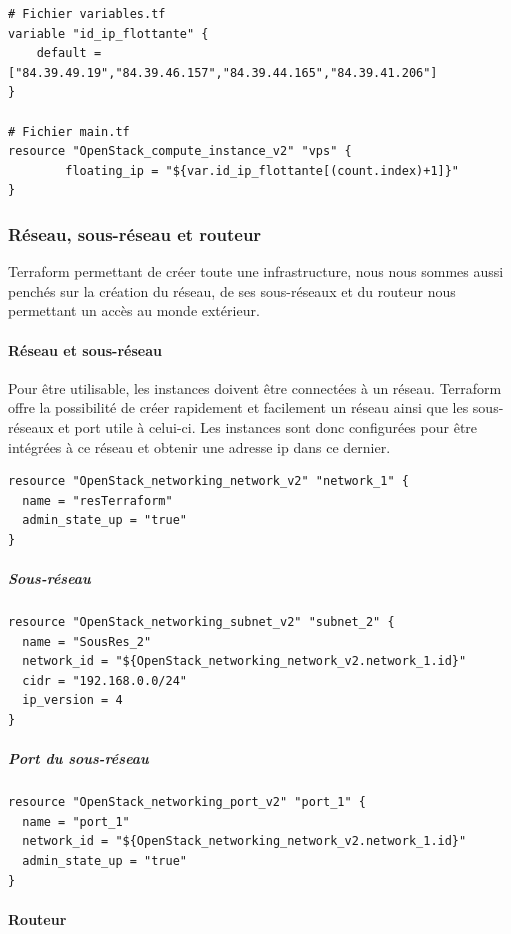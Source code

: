 \documentclass[]{article}
\let\oldparagraph\paragraph
\renewcommand{\paragraph}[1]{\oldparagraph{#1}\mbox{}}
\let\oldsubparagraph\subparagraph
\renewcommand{\subparagraph}[1]{\oldsubparagraph{#1}\mbox{}}
\begin{document}
\begin{verbatim}
# Fichier variables.tf
variable "id_ip_flottante" {
    default = ["84.39.49.19","84.39.46.157","84.39.44.165","84.39.41.206"]
}

# Fichier main.tf
resource "OpenStack_compute_instance_v2" "vps" {
        floating_ip = "${var.id_ip_flottante[(count.index)+1]}"
}
\end{verbatim}

\subsubsection{Réseau, sous-réseau et
routeur}\label{ruxe9seau-sous-ruxe9seau-et-routeur}

Terraform permettant de créer toute une infrastructure, nous nous sommes
aussi penchés sur la création du réseau, de ses sous-réseaux et du
routeur nous permettant un accès au monde extérieur.

\paragraph{Réseau et sous-réseau}\label{ruxe9seau-et-sous-ruxe9seau}

Pour être utilisable, les instances doivent être connectées à un réseau.
Terraform offre la possibilité de créer rapidement et facilement un
réseau ainsi que les sous-réseaux et port utile à celui-ci. Les
instances sont donc configurées pour être intégrées à ce réseau et
obtenir une adresse ip dans ce dernier. 
\begin{verbatim}
resource "OpenStack_networking_network_v2" "network_1" {
  name = "resTerraform"
  admin_state_up = "true"
}
\end{verbatim}

\subparagraph{Sous-réseau}\label{sous-ruxe9seau}
\begin{verbatim}
resource "OpenStack_networking_subnet_v2" "subnet_2" {
  name = "SousRes_2"
  network_id = "${OpenStack_networking_network_v2.network_1.id}"
  cidr = "192.168.0.0/24"
  ip_version = 4 
}
\end{verbatim}

\subparagraph{Port du sous-réseau}\label{port-du-sous-ruxe9seau}
\begin{verbatim}
resource "OpenStack_networking_port_v2" "port_1" {
  name = "port_1"
  network_id = "${OpenStack_networking_network_v2.network_1.id}"
  admin_state_up = "true"
}
\end{verbatim}

\paragraph{Routeur}\label{routeur}
\end{document}
